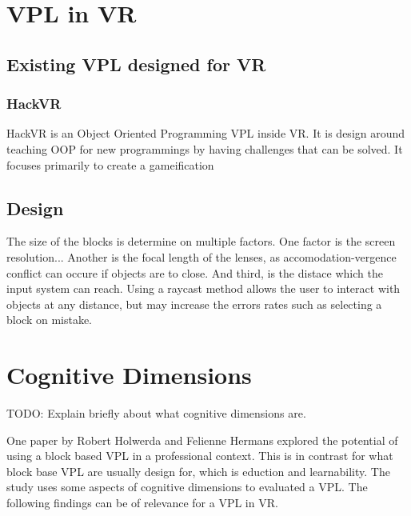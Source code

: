 \documentclass{sigchi}
\begin{document}


\section{VPL in VR}
\subsection{Existing VPL designed for VR}

\subsubsection{HackVR}
HackVR is an Object Oriented Programming VPL inside VR. It is design around teaching OOP for new programmings by having challenges that can be solved. It focuses primarily to create a gameification

\subsection{Design}
The size of the blocks is determine on multiple factors. One factor is the screen resolution... Another is the focal length of the lenses, as accomodation-vergence conflict can occure if objects are to close. And third, is the distace which the input system can reach. Using a raycast method allows the user to interact with objects at any distance, but may increase the errors rates such as selecting a block on mistake.

\section{Cognitive Dimensions}
TODO: Explain briefly about what cognitive dimensions are.

One paper by Robert Holwerda and Felienne Hermans explored the potential of using a block based VPL in a professional context. This is in contrast for what block base VPL are usually design for, which is eduction and learnability. The study uses some aspects of cognitive dimensions to evaluated a VPL. The following findings can be of relevance for a VPL in VR.
\end{document}
